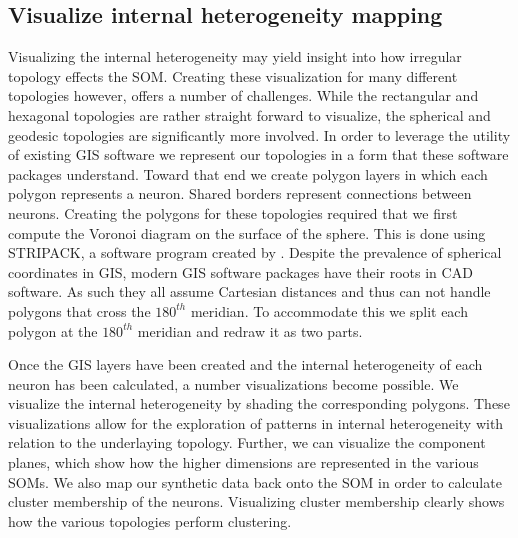 \subsection{Visualize internal heterogeneity mapping}
Visualizing the internal heterogeneity may yield insight into how irregular topology
effects the SOM.  Creating these visualization for many different topologies
however, offers a number of challenges.  While the rectangular and hexagonal
topologies are rather straight forward to visualize, the spherical and geodesic
topologies are significantly more involved.  In order to leverage the utility
of existing GIS software we represent our topologies in a form that
these software packages understand.  Toward that end we create polygon layers
in which each polygon represents a neuron.  Shared borders represent
connections between neurons.  Creating the polygons for these topologies
required that we first compute the Voronoi diagram on the surface of the
sphere.  This is done using STRIPACK, a software program created by
\cite{Ranka97}.  Despite the prevalence of spherical coordinates
in GIS, modern GIS software packages have their roots in CAD software. As such
they all assume Cartesian distances and thus can not handle polygons that
cross the $180^{th}$ meridian.  To accommodate this we split each polygon at
the $180^{th}$ meridian and redraw it as two parts.

Once the GIS layers have been created and the internal heterogeneity of each
neuron has been calculated, a number visualizations become possible. We
visualize the internal heterogeneity by shading the corresponding polygons.
These visualizations allow for the exploration of patterns in internal
heterogeneity with relation to the underlaying topology.  Further, we can
visualize the component planes, which show how the higher dimensions are
represented in the various SOMs.  We also map our synthetic data back onto the SOM in
order to calculate cluster membership of the neurons.  Visualizing cluster
membership clearly shows how the various topologies perform clustering.


